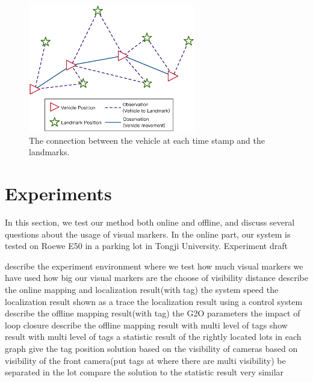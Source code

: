 \documentclass[journal]{IEEEtran}
\begin{document}
\begin{figure}
\centering
\includegraphics[height = 2.2in]{pic/fig9_Optimize}
\caption{
The connection between the vehicle at each time stamp and the landmarks.
}\label{fig:9}
\end{figure}



\section{Experiments}
In this section, we test our method both online and offline, and discuss several questions about the usage of visual markers. 
In the online part, our system is tested on Roewe E50 in a parking lot in Tongji University.
Experiment draft

describe the experiment environment
where we test
how much visual markers we have used
how big our visual markers are the choose of visibility distance 
describe the online mapping and localization result(with tag)
the system speed
the localization result shown as a trace
the localization result using a control system
describe the offline mapping result(with tag)
the G2O parameters
the impact of loop closure
describe the offline mapping result with multi level of tags
show result with multi level of tags
a statistic result of the rightly located lots in each graph
give the  tag position solution based on the visibility of cameras
based on visibility of the front camera(put tags at where there are multi visibility)
be separated in the lot
compare the solution to the statistic result
very similar


%
%
\end{document}
